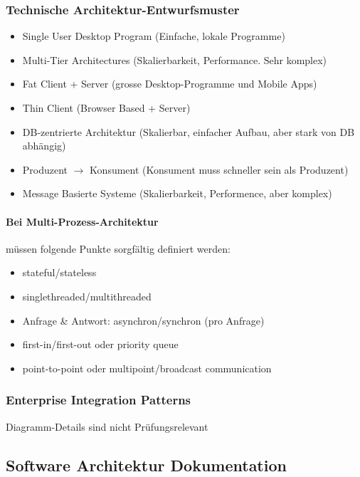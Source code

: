 \subsubsection{Technische Architektur-Entwurfsmuster}

\begin{itemize}
	\item Single User Desktop Program (Einfache, lokale Programme)
	\item Multi-Tier Architectures (Skalierbarkeit, Performance. Sehr komplex)
	\item Fat Client + Server (grosse Desktop-Programme und Mobile Apps)
	\item Thin Client (Browser Based + Server)
	\item DB-zentrierte Architektur  (Skalierbar, einfacher Aufbau, aber stark von DB abhängig)
	\item Produzent $\rightarrow$ Konsument (Konsument muss schneller sein als Produzent)
	\item Message Basierte Systeme (Skalierbarkeit, Performence, aber komplex)
\end{itemize}

\paragraph{Bei Multi-Prozess-Architektur}

müssen folgende Punkte sorgfältig definiert werden:

\begin{itemize}
	\item stateful/stateless
	\item singlethreaded/multithreaded
	\item Anfrage \& Antwort: asynchron/synchron (pro Anfrage)
	\item first-in/first-out oder priority queue
	\item point-to-point oder multipoint/broadcast communication
\end{itemize}

\subsubsection{Enterprise Integration Patterns}

Diagramm-Details sind nicht Prüfungsrelevant

\subsection{Software Architektur Dokumentation}

